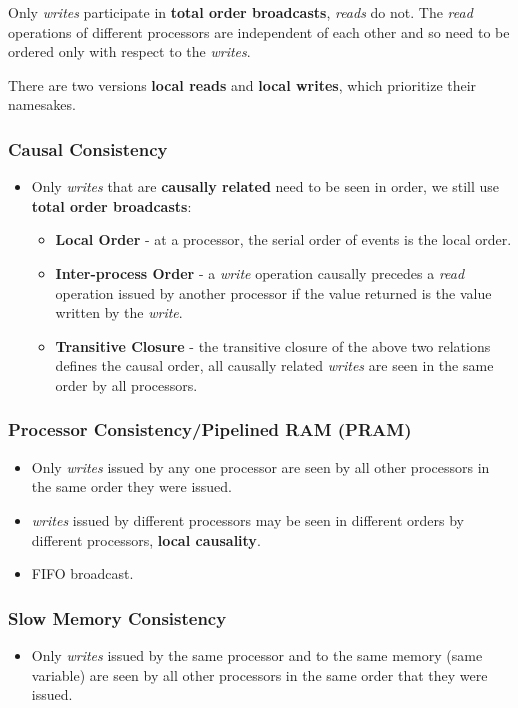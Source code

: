 \documentclass[11pt]{article}
\begin{document}
Only \textit{writes} participate in \textbf{total order broadcasts}, \textit{reads} do not.
The \textit{read} operations of different processors are independent of each other and so need to be ordered only with respect to the \textit{writes}.

There are two versions \textbf{local reads} and \textbf{local writes}, which prioritize their namesakes.

\subsubsection{Causal Consistency}
\begin{itemize}
  \item Only \textit{writes} that are \textbf{causally related} need to be seen in order, we still use \textbf{total order broadcasts}:
    \begin{itemize}
      \item \textbf{Local Order} - at a processor, the serial order of events is the local order.
      \item \textbf{Inter-process Order} - a \textit{write} operation causally precedes a \textit{read} operation issued by another processor if the value returned is the value written by the \textit{write}.
      \item \textbf{Transitive Closure} - the transitive closure of the above two relations defines the causal order, all causally related \textit{writes} are seen in the same order by all processors.
    \end{itemize}
\end{itemize}

\subsubsection{Processor Consistency/Pipelined RAM (PRAM)}
\begin{itemize}
  \item Only \textit{writes} issued by any one processor are seen by all other processors in the same order they were issued.
  \item \textit{writes} issued by different processors may be seen in different orders by different processors, \textbf{local causality}.
  \item FIFO broadcast.
\end{itemize}

\subsubsection{Slow Memory Consistency}
\begin{itemize}
  \item Only \textit{writes} issued by the same processor and to the same memory (same variable) are seen by all other processors in the same order that they were issued.
\end{itemize}
\end{document}
